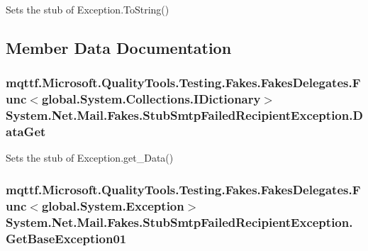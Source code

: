 Sets the stub of Exception.\-To\-String()



\subsection{Member Data Documentation}
\hypertarget{class_system_1_1_net_1_1_mail_1_1_fakes_1_1_stub_smtp_failed_recipient_exception_a7c9228e107621ec48f20fcfb3488bf68}{
\subsubsection[{Data\-Get}]{\setlength{\rightskip}{0pt plus 5cm}mqttf.\-Microsoft.\-Quality\-Tools.\-Testing.\-Fakes.\-Fakes\-Delegates.\-Func$<$global.\-System.\-Collections.\-I\-Dictionary$>$ System.\-Net.\-Mail.\-Fakes.\-Stub\-Smtp\-Failed\-Recipient\-Exception.\-Data\-Get}}\label{class_system_1_1_net_1_1_mail_1_1_fakes_1_1_stub_smtp_failed_recipient_exception_a7c9228e107621ec48f20fcfb3488bf68}


Sets the stub of Exception.\-get\-\_\-\-Data()

\hypertarget{class_system_1_1_net_1_1_mail_1_1_fakes_1_1_stub_smtp_failed_recipient_exception_a31153e7cf5936c057b0d7483b74fcbb1}{
\subsubsection[{Get\-Base\-Exception01}]{\setlength{\rightskip}{0pt plus 5cm}mqttf.\-Microsoft.\-Quality\-Tools.\-Testing.\-Fakes.\-Fakes\-Delegates.\-Func$<$global.\-System.\-Exception$>$ System.\-Net.\-Mail.\-Fakes.\-Stub\-Smtp\-Failed\-Recipient\-Exception.\-Get\-Base\-Exception01}}\label{class_system_1_1_net_1_1_mail_1_1_fakes_1_1_stub_smtp_failed_recipient_exception_a31153e7cf5936c057b0d7483b74fcbb1}


